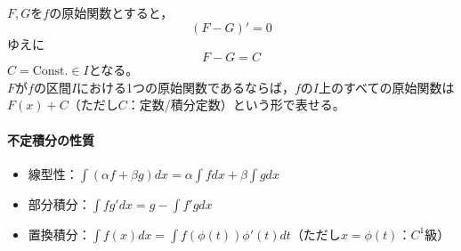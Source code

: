 \documentclass[dvipdfmx,a4j,10pt]{jsarticle}
\theoremstyle{mystyle1}
\theoremstyle{mystyle2}
\begin{document}
$F,G$を$f$の原始関数とすると，
\[
(F-G)'=0
\]
ゆえに
\[
F-G=C
\]
$C=\textrm{Const.}\in I$となる。\\

$F$が$f$の区間$I$における1つの原始関数であるならば，$f$の$I$上のすべての原始関数は$F(x)+C$（ただし$C$：定数/積分定数）という形で表せる。
\paragraph{不定積分の性質}
\begin{itemize}
\item 線型性：$\displaystyle \int (\alpha f+\beta g) dx=\alpha \int f dx + \beta \int g dx$
\item 部分積分：$\displaystyle \int fg' dx=g-\int f'g dx$
\item 置換積分：$\displaystyle \int f(x) dx=\int f(\phi(t))\phi'(t) dt$（ただし$x=\phi(t)$：$C^1$級）\footnotemark
\end{itemize}

\newpage
\end{document}

